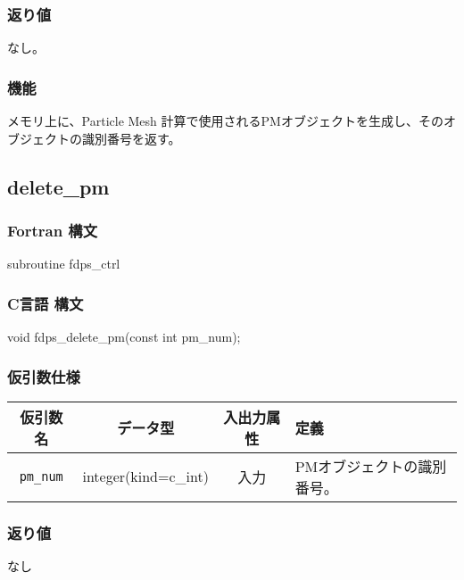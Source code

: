 \subsubsection*{返り値}
なし。

\subsubsection*{機能}
メモリ上に、Particle Mesh 計算で使用されるPMオブジェクトを生成し、そのオブジェクトの識別番号を返す。
\clearpage

\subsection{delete\_pm}
\subsubsection*{Fortran 構文}
\begin{screen}
\begin{spverbatim}
subroutine fdps_ctrl%
\end{spverbatim}
\end{screen}

\subsubsection*{C言語 構文}
\begin{screen}
\begin{spverbatim}
void fdps_delete_pm(const int pm_num);
\end{spverbatim}
\end{screen}

\subsubsection*{仮引数仕様}
\begin{table}[h]
\begin{tabularx}{\linewidth}{cccX}
\toprule
\rowcolor{Snow2}
仮引数名 & データ型 & 入出力属性 & 定義 \\
\midrule
\texttt{pm\_num} & integer(kind=c\_int) & 入力 & PMオブジェクトの識別番号。\\
\bottomrule
\end{tabularx}
\end{table}

\subsubsection*{返り値}
なし

